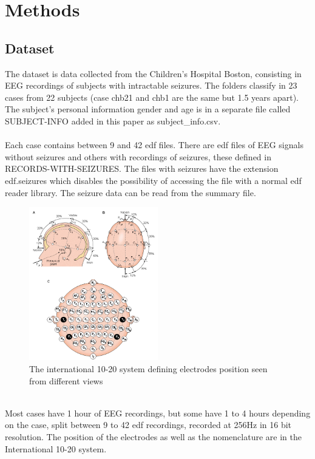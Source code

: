 \section{Methods}
\subsection{Dataset}
The dataset is data collected from the Children’s Hospital Boston, consisting in EEG recordings of subjects with intractable seizures. The folders classify in 23 cases from 22 subjects (case chb21 and chb1 are the same but 1.5 years apart). The subject’s personal information gender and age is in a separate file called SUBJECT-INFO added in this paper as subject\_info.csv.
\\\\
Each case contains between 9 and 42 edf files. There are edf files of EEG signals without seizures and others with recordings of seizures, these defined in RECORDS-WITH-SEIZURES. The files with seizures have the extension edf.seizures which disables the possibility of accessing the file with a normal edf reader library. The seizure data can be read from the summary file.
\\
\begin{figure}[h!]
  \caption{The international 10-20 system defining electrodes position seen from different views}
  \centering
  \includegraphics[width=0.5\textwidth]{img/electrodesposiiton.png}
\end{figure}
\\
Most cases have 1 hour of EEG recordings, but some have 1 to 4 hours depending on the case, split between 9 to 42 edf recordings, recorded at 256Hz in 16 bit resolution. The position of the electrodes as well as the nomenclature are in the International 10-20 system.
\\\\
